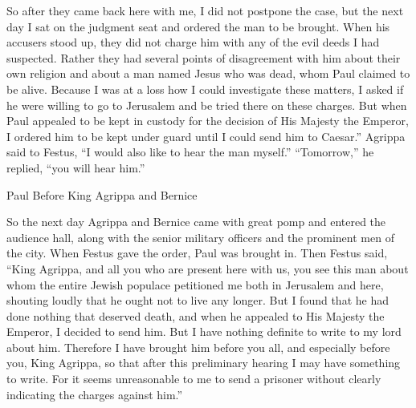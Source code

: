 {So after they came back here with me, I did not postpone the case, but the next day I sat on the judgment seat and ordered the man to be brought.
When his accusers stood up, they did not charge him with any of the evil deeds I had suspected.
Rather they had several points of disagreement with him about their own religion and about a man named Jesus who was dead, whom Paul claimed to be alive.
Because I was at a loss how I could investigate these matters, I asked if he were willing to go to Jerusalem and be tried there on these charges.
But when Paul appealed to be kept in custody for the decision of His Majesty the Emperor, I ordered him to be kept under guard until I could send him to Caesar.”
Agrippa said to Festus, “I would also like to hear the man myself.” “Tomorrow,” he replied, “you will hear him.”
\par }{\SH Paul Before King Agrippa and Bernice
\par }{\PP {}So the next day Agrippa and Bernice came with great pomp and entered the audience hall, along with the senior military officers and the prominent men of the city. When Festus gave the order, Paul was brought in.
Then Festus said, “King Agrippa, and all you who are present here with us, you see this man about whom the entire Jewish populace petitioned me both in Jerusalem and here, shouting loudly that he ought not to live any longer.
But I found that he had done nothing that deserved death, and when he appealed to His Majesty the Emperor, I decided to send him.
But I have nothing definite to write to my lord about him. Therefore I have brought him before you all, and especially before you, King Agrippa, so that after this preliminary hearing I may have something to write.
For it seems unreasonable to me to send a prisoner without clearly indicating the charges against him.”

}
